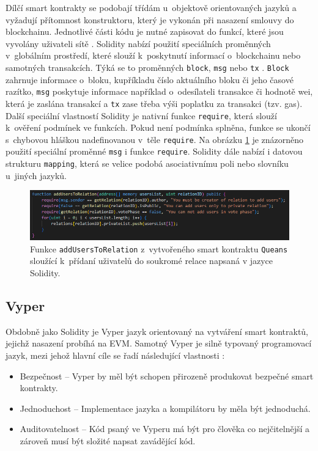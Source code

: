 Dílčí smart kontrakty se podobají třídám u~objektově orientovaných jazyků a vyžadují přítomnost konstruktoru, který je vykonán při nasazení smlouvy do blockchainu. Jednotlivé části kódu je nutné zapisovat do funkcí, které jsou vyvolány uživateli sítě \cite{WohrerZdun}. Solidity nabízí použití speciálních proměnných v~globálním prostředí, které slouží k~poskytnutí informací o~blockchainu nebo samotných transakcích. Týká se to proměnných \texttt{block}, \texttt{msg} nebo \texttt{tx} \cite{eth_variables}. \texttt{Block} zahrnuje informace o~bloku, kupříkladu číslo aktuálního bloku či jeho časové razítko, \texttt{msg} poskytuje informace například o~odesílateli transakce či hodnotě wei, která je zaslána transakcí a \texttt{tx} zase třeba výši poplatku za transakci (tzv. gas). Další speciální vlastností Solidity je nativní funkce \texttt{require}, která slouží k~ověření podmínek ve funkcích. Pokud není podmínka splněna, funkce se ukončí s~chybovou hláškou nadefinovanou v~těle \texttt{require}. Na obrázku \ref{fig:solidity} je znázorněno použití speciální proměnné \texttt{msg} i funkce \texttt{require}. Solidity dále nabízí i datovou strukturu \texttt{mapping}, která se velice podobá asociativnímu poli nebo slovníku u~jiných jazyků. 

\begin{figure}
\centering
\includegraphics[width=\textwidth]{obrazky/Solidity.png}
\caption{Funkce \texttt{addUsersToRelation} z~vytvořeného smart kontraktu \texttt{Queans} sloužící k~přídaní uživatelů do soukromé relace napsaná v jazyce Solidity.}
\label{fig:solidity}
\end{figure}

\subsection{Vyper}
Obdobně jako Solidity je Vyper jazyk orientovaný na vytváření smart kontraktů, jejichž nasazení probíhá na EVM. Samotný Vyper je silně typovaný programovací jazyk, mezi jehož hlavní cíle se řadí následující vlastnosti \cite{vyper1}: 
\begin{itemize}
\item Bezpečnost -- Vyper by měl být schopen přirozeně produkovat bezpečné smart kontrakty.
\item Jednoduchost -- Implementace jazyka a kompilátoru by měla být jednoduchá.
\item Auditovatelnost -- Kód psaný ve Vyperu má být pro člověka co nejčitelnější a zároveň musí být složité napsat zavádějící kód.
\end{itemize}

